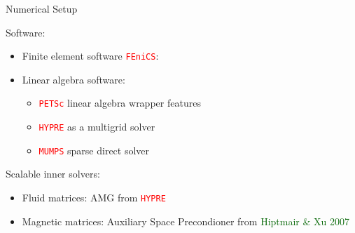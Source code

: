 \documentclass[12pt]{beamer}
\newcommand{\gr}[1]{\textcolor{darkgreen} {#1}}
\newcommand{\re}[1]{{\textcolor{red}       {#1}}}
\begin{document}
\begin{frame}{Numerical Setup}

{\large Software:}
\begin{itemize}
  \item Finite element software \re{\tt FEniCS}:
  \item Linear algebra software:
  \begin{itemize}
    \item \re{\tt PETSc} linear algebra wrapper features
    \item \re{\tt HYPRE} as a multigrid solver
    \item \re{\tt MUMPS} sparse direct solver
  \end{itemize}
\end{itemize}

\vspace{3mm}

{\large Scalable inner solvers:}
  \begin{itemize}
    \item Fluid matrices: AMG from \re{\tt HYPRE}
    \item Magnetic matrices: Auxiliary Space Precondioner from \gr{Hiptmair \& Xu 2007}
  \end{itemize}




\end{frame}
\end{document}

